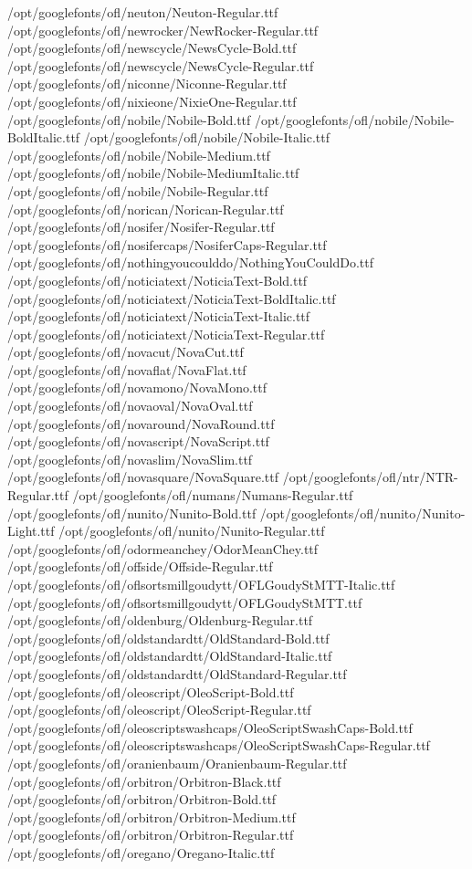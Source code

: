 /opt/googlefonts/ofl/neuton/Neuton-Regular.ttf
/opt/googlefonts/ofl/newrocker/NewRocker-Regular.ttf
/opt/googlefonts/ofl/newscycle/NewsCycle-Bold.ttf
/opt/googlefonts/ofl/newscycle/NewsCycle-Regular.ttf
/opt/googlefonts/ofl/niconne/Niconne-Regular.ttf
/opt/googlefonts/ofl/nixieone/NixieOne-Regular.ttf
/opt/googlefonts/ofl/nobile/Nobile-Bold.ttf
/opt/googlefonts/ofl/nobile/Nobile-BoldItalic.ttf
/opt/googlefonts/ofl/nobile/Nobile-Italic.ttf
/opt/googlefonts/ofl/nobile/Nobile-Medium.ttf
/opt/googlefonts/ofl/nobile/Nobile-MediumItalic.ttf
/opt/googlefonts/ofl/nobile/Nobile-Regular.ttf
/opt/googlefonts/ofl/norican/Norican-Regular.ttf
/opt/googlefonts/ofl/nosifer/Nosifer-Regular.ttf
/opt/googlefonts/ofl/nosifercaps/NosiferCaps-Regular.ttf
/opt/googlefonts/ofl/nothingyoucoulddo/NothingYouCouldDo.ttf
/opt/googlefonts/ofl/noticiatext/NoticiaText-Bold.ttf
/opt/googlefonts/ofl/noticiatext/NoticiaText-BoldItalic.ttf
/opt/googlefonts/ofl/noticiatext/NoticiaText-Italic.ttf
/opt/googlefonts/ofl/noticiatext/NoticiaText-Regular.ttf
/opt/googlefonts/ofl/novacut/NovaCut.ttf
/opt/googlefonts/ofl/novaflat/NovaFlat.ttf
/opt/googlefonts/ofl/novamono/NovaMono.ttf
/opt/googlefonts/ofl/novaoval/NovaOval.ttf
/opt/googlefonts/ofl/novaround/NovaRound.ttf
/opt/googlefonts/ofl/novascript/NovaScript.ttf
/opt/googlefonts/ofl/novaslim/NovaSlim.ttf
/opt/googlefonts/ofl/novasquare/NovaSquare.ttf
/opt/googlefonts/ofl/ntr/NTR-Regular.ttf
/opt/googlefonts/ofl/numans/Numans-Regular.ttf
/opt/googlefonts/ofl/nunito/Nunito-Bold.ttf
/opt/googlefonts/ofl/nunito/Nunito-Light.ttf
/opt/googlefonts/ofl/nunito/Nunito-Regular.ttf
/opt/googlefonts/ofl/odormeanchey/OdorMeanChey.ttf
/opt/googlefonts/ofl/offside/Offside-Regular.ttf
/opt/googlefonts/ofl/oflsortsmillgoudytt/OFLGoudyStMTT-Italic.ttf
/opt/googlefonts/ofl/oflsortsmillgoudytt/OFLGoudyStMTT.ttf
/opt/googlefonts/ofl/oldenburg/Oldenburg-Regular.ttf
/opt/googlefonts/ofl/oldstandardtt/OldStandard-Bold.ttf
/opt/googlefonts/ofl/oldstandardtt/OldStandard-Italic.ttf
/opt/googlefonts/ofl/oldstandardtt/OldStandard-Regular.ttf
/opt/googlefonts/ofl/oleoscript/OleoScript-Bold.ttf
/opt/googlefonts/ofl/oleoscript/OleoScript-Regular.ttf
/opt/googlefonts/ofl/oleoscriptswashcaps/OleoScriptSwashCaps-Bold.ttf
/opt/googlefonts/ofl/oleoscriptswashcaps/OleoScriptSwashCaps-Regular.ttf
/opt/googlefonts/ofl/oranienbaum/Oranienbaum-Regular.ttf
/opt/googlefonts/ofl/orbitron/Orbitron-Black.ttf
/opt/googlefonts/ofl/orbitron/Orbitron-Bold.ttf
/opt/googlefonts/ofl/orbitron/Orbitron-Medium.ttf
/opt/googlefonts/ofl/orbitron/Orbitron-Regular.ttf
/opt/googlefonts/ofl/oregano/Oregano-Italic.ttf
